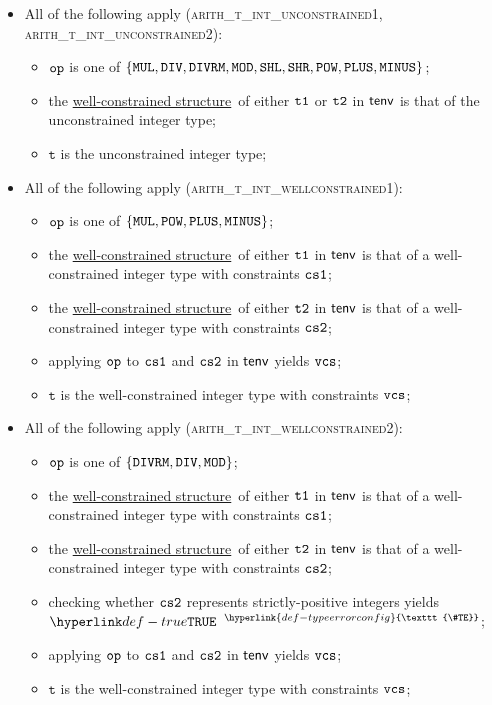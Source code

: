 \documentclass{book}
\newcommand\TypeErrorConfig[0]{\hyperlink{def-typeerrorconfig}{\texttt{\#TE}}}
\newcommand\ProseOrTypeError[0]{\hyperlink{def-proseortypeerror}{$^{\TypeErrorConfig}$}}
\newcommand\wellconstrainedstructure[0]{\hyperlink{def-getwellconstrainedstructure}{well-constrained structure}}
\newcommand\vt[0]{\texttt{t}}
\begin{document}
\begin{itemize}
  \item All of the following apply (\textsc{arith\_t\_int\_unconstrained1}, \\
                                    \textsc{arith\_t\_int\_unconstrained2}):
  \begin{itemize}
    \item $\texttt{op}$ is one of $\{\texttt{MUL}, \texttt{DIV}, \texttt{DIVRM}, \texttt{MOD}, \texttt{SHL},  \texttt{SHR}, \texttt{POW}, \texttt{PLUS}, \texttt{MINUS}\}$;
    \item the \wellconstrainedstructure\ of either $\texttt{t1}$ or $\texttt{t2}$ in $\textsf{tenv}$ is that of the unconstrained integer type;
    \item $\vt$ is the unconstrained integer type;
  \end{itemize}

  \item All of the following apply (\textsc{arith\_t\_int\_wellconstrained1}):
  \begin{itemize}
    \item $\texttt{op}$ is one of $\{\texttt{MUL}, \texttt{POW}, \texttt{PLUS}, \texttt{MINUS}\}$;
    \item the \wellconstrainedstructure\ of either $\texttt{t1}$ in $\textsf{tenv}$ is that of a well-constrained integer type with
          constraints $\texttt{cs1}$;
          \item the \wellconstrainedstructure\ of either $\texttt{t2}$ in $\textsf{tenv}$ is that of a well-constrained integer type with
          constraints $\texttt{cs2}$;
    \item applying $\texttt{op}$ to $\texttt{cs1}$ and $\texttt{cs2}$ in $\textsf{tenv}$ yields $\texttt{vcs}$;
    \item $\vt$ is the well-constrained integer type with constraints $\texttt{vcs}$;
  \end{itemize}

  \item All of the following apply (\textsc{arith\_t\_int\_wellconstrained2}):
  \begin{itemize}
    \item $\texttt{op}$ is one of $\{\texttt{DIVRM}, \texttt{DIV}, \texttt{MOD}\}$;
    \item the \wellconstrainedstructure\ of either $\texttt{t1}$ in $\textsf{tenv}$ is that of a well-constrained integer type with
          constraints $\texttt{cs1}$;
          \item the \wellconstrainedstructure\ of either $\texttt{t2}$ in $\textsf{tenv}$ is that of a well-constrained integer type with
          constraints $\texttt{cs2}$;
    \item checking whether $\texttt{cs2}$ represents strictly-positive integers yields $\True$ \ProseOrTypeError;
    \item applying $\texttt{op}$ to $\texttt{cs1}$ and $\texttt{cs2}$ in $\textsf{tenv}$ yields $\texttt{vcs}$;
    \item $\vt$ is the well-constrained integer type with constraints $\texttt{vcs}$;
  \end{itemize}


\end{itemize}
\end{document}
